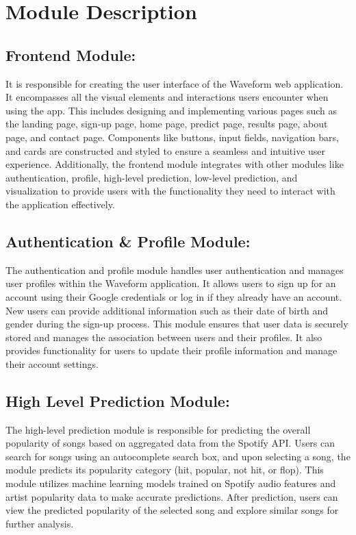 \documentclass[11pt]{report}
\begin{document}
\newpage
\section{Module Description}
\subsection*{Frontend Module:}
It is responsible for creating the user interface of the Waveform web application. It encompasses all the visual elements and interactions users encounter when using the app. This includes designing and implementing various pages such as the landing page, sign-up page, home page, predict page, results page, about page, and contact page. Components like buttons, input fields, navigation bars, and cards are constructed and styled to ensure a seamless and intuitive user experience. Additionally, the frontend module integrates with other modules like authentication, profile, high-level prediction, low-level prediction, and visualization to provide users with the functionality they need to interact with the application effectively.

\subsection*{Authentication \& Profile Module:}
The authentication and profile module handles user authentication and manages user profiles within the Waveform application. It allows users to sign up for an account using their Google credentials or log in if they already have an account. New users can provide additional information such as their date of birth and gender during the sign-up process. This module ensures that user data is securely stored and manages the association between users and their profiles. It also provides functionality for users to update their profile information and manage their account settings.

\subsection*{High Level Prediction Module:}
The high-level prediction module is responsible for predicting the overall popularity of songs based on aggregated data from the Spotify API. Users can search for songs using an autocomplete search box, and upon selecting a song, the module predicts its popularity category (hit, popular, not hit, or flop). This module utilizes machine learning models trained on Spotify audio features and artist popularity data to make accurate predictions. After prediction, users can view the predicted popularity of the selected song and explore similar songs for further analysis.
\end{document}
